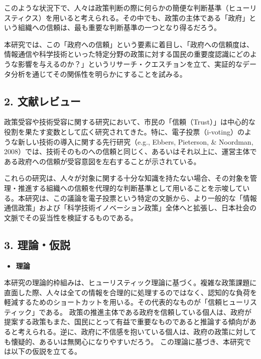 \documentclass[
  xelatex]{bxjsarticle}
\providecommand{\tightlist}{%
  \setlength{\itemsep}{0pt}\setlength{\parskip}{0pt}}
\begin{document}
このような状況下で、人々は政策判断の際に何らかの簡便な判断基準（ヒューリスティクス）を用いると考えられる。その中でも、政策の主体である「政府」という組織への信頼は、最も重要な判断基準の一つとなり得るだろう。

本研究では、この「政府への信頼」という要素に着目し、「政府への信頼度は、情報通信や科学技術といった特定分野の政策に対する国民の重要度認識にどのような影響を与えるのか？」というリサーチ・クエスチョンを立て、実証的なデータ分析を通じてその関係性を明らかにすることを試みる。

\subsection{2. 文献レビュー}\label{ux6587ux732eux30ecux30d3ux30e5ux30fc}

政策受容や技術受容に関する研究において、市民の「信頼（Trust）」は中心的な役割を果たす変数として広く研究されてきた。特に、電子投票（i-voting）のような新しい技術の導入に関する先行研究（e.g.,
Ebbers, Pieterson, \& Noordman,
2008）では、技術そのものへの信頼と同じく、あるいはそれ以上に、運営主体である政府への信頼が受容意図を左右することが示されている。

これらの研究は、人々が対象に関する十分な知識を持たない場合、その対象を管理・推進する組織への信頼を代理的な判断基準として用いることを示唆している。本研究は、この議論を電子投票という特定の文脈から、より一般的な「情報通信政策」および「科学技術イノベーション政策」全体へと拡張し、日本社会の文脈でその妥当性を検証するものである。

\subsection{3. 理論・仮説}\label{ux7406ux8ad6ux4eeeux8aac}

\begin{itemize}
\tightlist
\item
  \textbf{理論}
\end{itemize}

本研究の理論的枠組みは、ヒューリスティック理論に基づく。複雑な政策課題に直面した際、人々は全ての情報を合理的に処理するのではなく、認知的な負荷を軽減するためのショートカットを用いる。その代表的なものが「信頼ヒューリスティック」である。
政策の推進主体である政府を信頼している個人は、政府が提案する政策もまた、国民にとって有益で重要なものであると推論する傾向があると考えられる。逆に、政府に不信感を抱いている個人は、政府の政策に対しても懐疑的、あるいは無関心になりやすいだろう。
この理論に基づき、本研究では以下の仮説を立てる。
\end{document}
